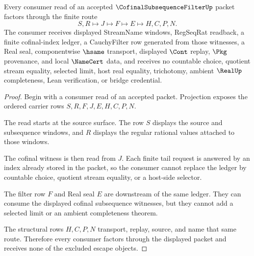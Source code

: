 \begin{theorem}
\label{thm:cofinal-subsequence-filter-nonescape}
Every consumer read of an accepted $\CofinalSubsequenceFilterUp$ packet factors through the finite route
$$
S,R \longmapsto J \longmapsto F \longmapsto E \longmapsto H,C,P,N .
$$
The consumer receives displayed StreamName windows, RegSeqRat readback, a finite cofinal-index ledger, a CauchyFilter row generated from those witnesses, a Real seal, componentwise $\hsame$ transport, displayed $\Cont$ replay, $\Pkg$ provenance, and local $\NameCert$ data, and receives no countable choice, quotient stream equality, selected limit, host real equality, trichotomy, ambient $\RealUp$ completeness, Lean verification, or bridge credential.
\end{theorem}
\begin{proof}
Begin with a consumer read of an accepted packet. Projection exposes the ordered carrier rows $S,R,F,J,E,H,C,P,N$.

The read starts at the source surface. The row $S$ displays the source and subsequence windows, and $R$ displays the regular rational values attached to those windows.

The cofinal witness is then read from $J$. Each finite tail request is answered by an index already stored in the packet, so the consumer cannot replace the ledger by countable choice, quotient stream equality, or a host-side selector.

The filter row $F$ and Real seal $E$ are downstream of the same ledger. They can consume the displayed cofinal subsequence witnesses, but they cannot add a selected limit or an ambient completeness theorem.

The structural rows $H,C,P,N$ transport, replay, source, and name that same route. Therefore every consumer factors through the displayed packet and receives none of the excluded escape objects.
\end{proof}


